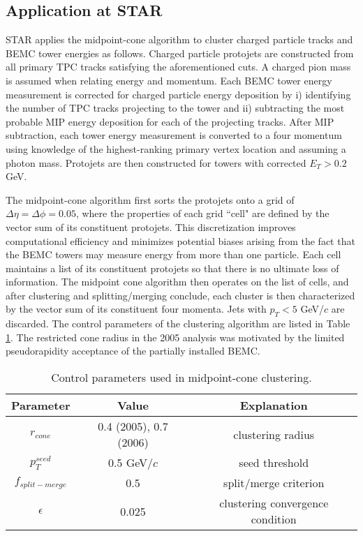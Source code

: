\subsection{Application at STAR}

STAR applies the midpoint-cone algorithm to cluster charged particle tracks and BEMC tower energies as follows.  Charged particle protojets are constructed from all primary TPC tracks satisfying the aforementioned cuts.  A charged pion mass is assumed when relating energy and momentum.  Each BEMC tower energy measurement is corrected for charged particle energy deposition by i) identifying the number of TPC tracks projecting to the tower and ii) subtracting the most probable MIP energy deposition for each of the projecting tracks.  After MIP subtraction, each tower energy measurement is converted to a four momentum using knowledge of the highest-ranking primary vertex location and assuming a photon mass.  Protojets are then constructed for towers with corrected $E_{T}>0.2 $GeV.   

The midpoint-cone algorithm first sorts the protojets onto a grid of $\Delta\eta=\Delta\phi=0.05$, where the properties of each grid ``cell" are defined by the vector sum of its constituent protojets.  This discretization  improves computational efficiency and minimizes potential biases arising from the fact that the BEMC towers may measure energy from more than one particle.   Each cell maintains a list of its constituent protojets so that there is no ultimate loss of information.  The midpoint cone algorithm then operates on the list of cells, and after clustering and splitting/merging conclude, each cluster is then characterized by the vector sum of its constituent four momenta.  Jets with $p_{T}<5$ GeV/$c$ are discarded.  The control parameters of the clustering algorithm are listed in Table \ref{tbl:jetfinding-parameters}.  The restricted cone radius in the 2005 analysis was motivated by the limited pseudorapidity acceptance of the partially installed BEMC.

\begin{table}
  \begin{center}
      \begin{tabular}{c|c|c}
      Parameter & Value & Explanation\\
      \hline \hline
      $r_{cone}$  &   0.4 (2005), 0.7 (2006) & clustering radius \\ \hline
      $p_{T}^{seed}$  &   0.5 GeV/$c$ & seed threshold \\ \hline
      $f_{split-merge}$  &  0.5  & split/merge criterion \\ \hline
      $\epsilon$  &  0.025  & clustering convergence condition \\
      \end{tabular}
  \end{center}
  \caption{Control parameters used in midpoint-cone clustering.}
  \label{tbl:jetfinding-parameters}
\end{table}
